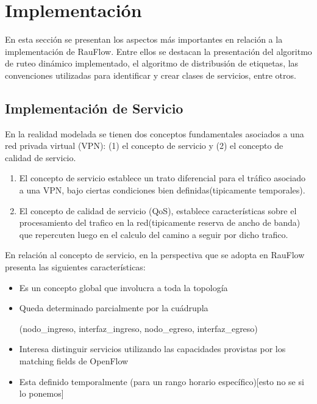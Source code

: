 \section[Implementaci\'on]{Implementaci\'on}

En esta secci\'on se presentan los aspectos m\'as importantes en relaci\'on a la implementaci\'on de RauFlow. Entre ellos se destacan la presentaci\'on del algoritmo de ruteo din\'amico implementado, el algoritmo de distribusi\'on de etiquetas, las convenciones utilizadas para identificar y crear clases de servicios, entre otros.\\

\subsection{Implementación de Servicio}

En la realidad modelada se tienen dos conceptos fundamentales asociados a una red privada virtual (VPN): (1) el concepto de servicio y (2) el concepto de calidad de servicio.

\begin{enumerate}
\item El concepto de servicio establece un trato diferencial para el tr\'afico asociado a una VPN, bajo ciertas condiciones bien definidas(tipicamente temporales). 
\item El concepto de calidad de servicio (QoS), establece características sobre el procesamiento del trafico en la red(tipicamente reserva de ancho de banda) que repercuten luego en el calculo del camino a seguir por dicho trafico.
\end{enumerate}

En relación al concepto de servicio, en la perspectiva que se adopta en RauFlow presenta las siguientes  características:

\begin{itemize}
\item Es un concepto global que involucra a toda la topolog\'ia
\item Queda determinado parcialmente por la cuádrupla 
\begin{center}
(nodo\_ingreso, interfaz\_ingreso, nodo\_egreso, interfaz\_egreso)
\end{center}
\item Interesa distinguir servicios utilizando las capacidades provistas por los matching fields de OpenFlow 
\item Esta definido temporalmente (para un rango horario espec\'ifico)[esto no se si lo ponemos]
\end{itemize}

